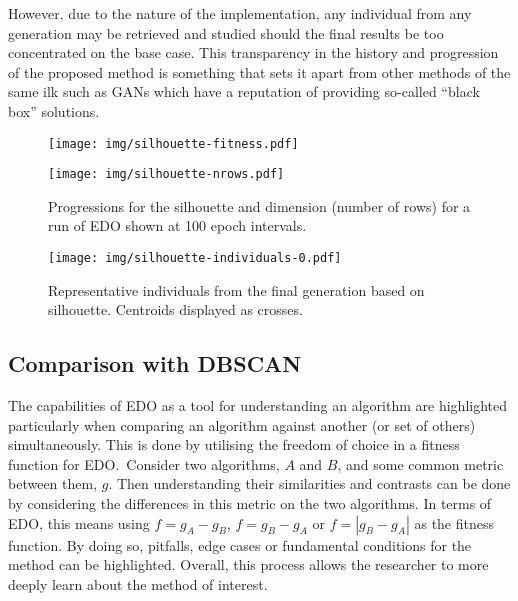 However, due to the nature of the implementation, any individual from any
generation may be retrieved and studied should the final results be too
concentrated on the base case. This transparency in the history and progression
of the proposed method is something that sets it apart from other methods of the
same ilk such as GANs which have a reputation of providing so-called ``black
box'' solutions.

\begin{figure}[htbp]
    \centering
    \begin{minipage}{\imgwidth}
        \centering
        \texttt{[image: img/silhouette-fitness.pdf]}
    \end{minipage}

    \begin{minipage}{\imgwidth}
        \centering
        \texttt{[image: img/silhouette-nrows.pdf]}
    \end{minipage}
    \caption{Progressions for the silhouette and dimension (number of rows) for
             a run of EDO shown at 100 epoch
             intervals.}\label{figure:silhouette}
\end{figure}

\begin{figure}[htbp]
    \centering
    \texttt{[image: img/silhouette-individuals-0.pdf]}
    \caption{Representative individuals from the final generation based on
             silhouette. Centroids displayed as
             crosses.}\label{figure:silhouette-individuals}
\end{figure}


\subsection{Comparison with DBSCAN}

The capabilities of EDO as a tool for understanding an algorithm are highlighted
particularly when comparing an algorithm against another (or set of others)
simultaneously.  This is done by utilising the freedom of choice in a fitness
function for EDO.\ Consider two algorithms, \(A\) and \(B\), and some common
metric between them, \(g\). Then understanding their similarities and contrasts
can be done by considering the differences in this metric on the two algorithms.
In terms of EDO, this means using \(f = g_A - g_B\), \(f = g_B - g_A\) or \(f
= \left| g_B - g_A \right|\) as the fitness function. By doing so, pitfalls,
edge cases or fundamental conditions for the method can be highlighted.
Overall, this process allows the researcher to more deeply learn about the
method of interest.

